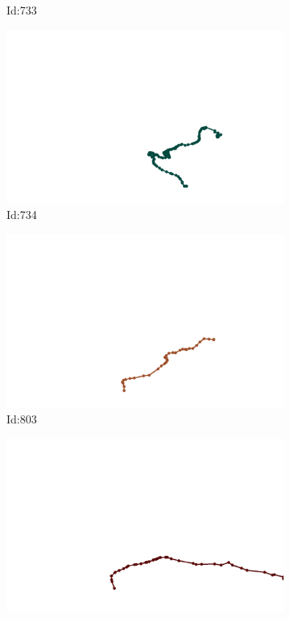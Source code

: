 \documentclass[12pt,twoside]{report}
\begin{document}
\begin{figure}
\begin{subfigure}[b]{0.20\textwidth}
\caption{Id:733}
\end{subfigure}
\begin{subfigure}[b]{0.20\textwidth}
\centering
\includegraphics[width=\textwidth]{../trajectories/734.png}
\caption{Id:734}
\end{subfigure}
\begin{subfigure}[b]{0.20\textwidth}
\centering
\includegraphics[width=\textwidth]{../trajectories/803.png}
\caption{Id:803}
\end{subfigure}
\begin{subfigure}[b]{0.20\textwidth}
\centering
\includegraphics[width=\textwidth]{../trajectories/806.png}

\end{subfigure}
\end{figure}
\end{document}
